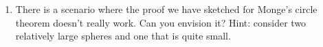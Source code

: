 \begin{enumerate}
\item There is a scenario where the proof we have sketched for
Monge's circle theorem doesn't really work.  Can you envision it?
Hint: consider two relatively large spheres and one that is quite
small.
\end{enumerate}




